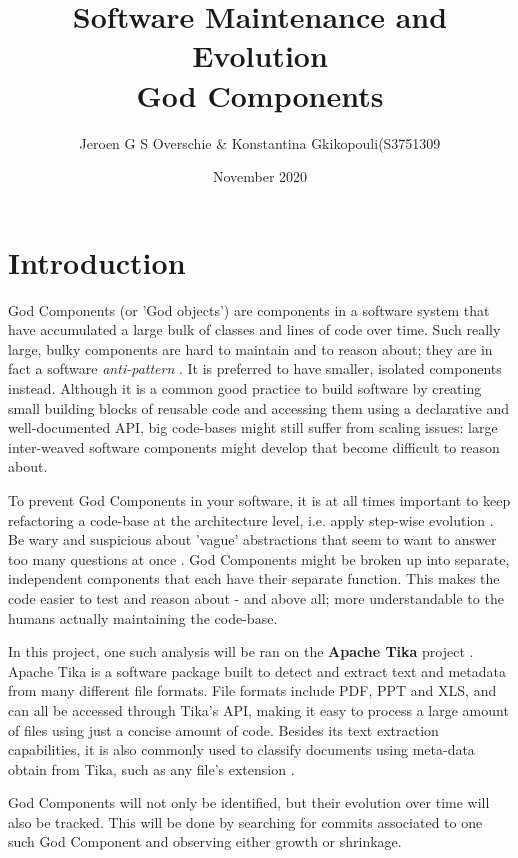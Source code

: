 \documentclass{article}
\title{Software Maintenance and Evolution \\God Components}
\author{Jeroen G S Overschie \& Konstantina Gkikopouli(S3751309}
\date{November 2020}
\begin{document}
\maketitle

\tableofcontents
\newpage

\section{Introduction}
God Components (or 'God objects') are components in a software system that have accumulated a large bulk of classes and lines of code over time. Such really large, bulky components are hard to maintain and to reason about; they are in fact a software \textit{anti-pattern} \citep{smith2000software}. It is preferred to have smaller, isolated components instead. Although it is a common good practice to build software by creating small building blocks of reusable code and accessing them using a declarative and well-documented API, big code-bases might still suffer from scaling issues: large inter-weaved software components might develop that become difficult to reason about.

To prevent God Components in your software, it is at all times important to keep refactoring a code-base at the architecture level, i.e. apply step-wise evolution \citep{toward_a_catalogue_of_architetural_bad_smells}. Be wary and suspicious about 'vague' abstractions that seem to want to answer too many questions at once \citep{riel1996object}. God Components might be broken up into separate, independent components that each have their separate function. This makes the code easier to test and reason about - and above all; more understandable to the humans actually maintaining the code-base.

In this project, one such analysis will be ran on the \textbf{Apache Tika} project \citep{apache_software_foundation_2020}. Apache Tika is a software package built to detect and extract text and metadata from many different file formats. File formats include PDF, PPT and XLS, and can all be accessed through Tika's API, making it easy to process a large amount of files using just a concise amount of code. Besides its text extraction capabilities, it is also commonly used to classify documents using meta-data obtain from Tika, such as any file's extension \citep{Tika}.

God Components will not only be identified, but their evolution over time will also be tracked. This will be done by searching for commits associated to one such God Component and observing either growth or shrinkage.
\end{document}
